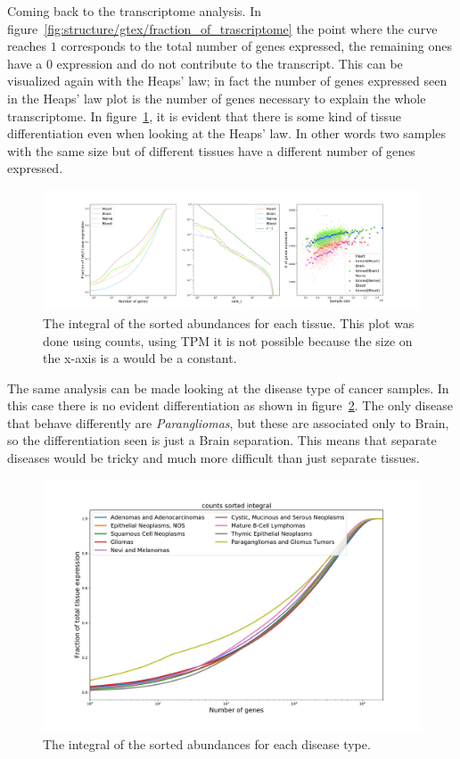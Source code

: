 Coming back to the transcriptome analysis. In figure~\ref{fig:structure/gtex/fraction_of_trascriptome} the point where the curve reaches $1$ corresponds to the total number of genes expressed, the remaining ones have a $0$ expression and do not contribute to the transcript. This can be visualized again with the Heaps' law; in fact the number of genes expressed seen in the Heaps' law plot is the number of genes necessary to explain the whole transcriptome. In figure~\ref{fig:structure/gtex/heaps_tissue}, it is evident that there is some kind of tissue differentiation even when looking at the Heaps' law. In other words two samples with the same size but of different tissues have a different number of genes expressed.
\begin{figure}[htb!]
  \centering
  \includegraphics[width=0.5\linewidth]{pictures/structure/gtex/heaps_tissue.pdf}
  \caption{The integral of the sorted abundances for each tissue. This plot was done using counts, using TPM it is not possible because the size on the x-axis is a would be a constant.}
  \label{fig:structure/gtex/heaps_tissue}
\end{figure}
The same analysis can be made looking at the disease type of cancer samples. In this case there is no evident differentiation as shown in figure~\ref{fig:structure/tcga/fraction_of_trascriptome_disease}. The only disease that behave differently are \textit{Parangliomas}, but these are associated only to Brain, so the differentiation seen is just a Brain separation. This means that separate diseases would be tricky and much more difficult than just separate tissues.
\begin{figure}[htb!]
  \centering
  \includegraphics[width=0.8\linewidth]{pictures/structure/tcga/fraction_of_trascriptome_disease.pdf}
  \caption{The integral of the sorted abundances for each disease type.}
  \label{fig:structure/tcga/fraction_of_trascriptome_disease}
\end{figure}

